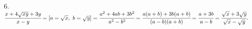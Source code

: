 6. $\cfrac{x+4\sqrt{xy}+3y}{x-y}=[a=\sqrt{x},\ b=\sqrt{y}]=\cfrac{a^2+4ab+3b^2}{a^2-b^2}=\cfrac{a(a+b)+3b(a+b)}{(a-b)(a+b)}=\cfrac{a+3b}{a-b}=
\cfrac{\sqrt{x}+3\sqrt{y}}{\sqrt{x}-\sqrt{y}}.$\\
